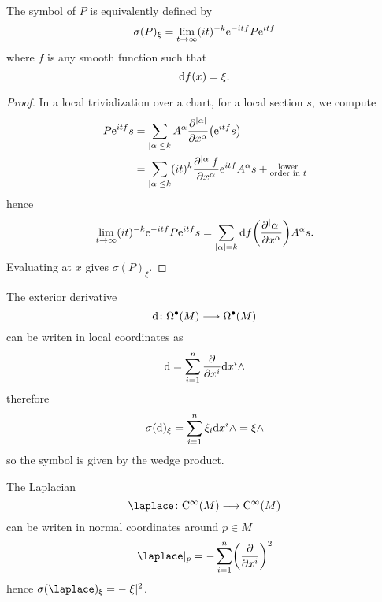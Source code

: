 \begin{lemma}
  The symbol of $P$ is equivalently defined by
  \begin{equation*}
    \sigma(P)_\xi = \lim_{t \to \infty} (it)^{-k} \mathrm{e}^{-i t f}
    P \mathrm{e}^{i t f}
  \end{equation*}
  where $f$ is any smooth function such that
  \begin{equation*}
    \mathrm{d} f (x) = \xi.
  \end{equation*}
\end{lemma}
\begin{proof}
  In a local trivialization over a chart, for a local section $s$, we compute
  \begin{align*}
    P \mathrm{e}^{i t f} s
     & = \sum_{|\alpha| \leq k} A^\alpha
    \frac{\partial^{|\alpha|}}{\partial x^\alpha}
    \bigl( \mathrm{e}^{i t f} s \bigr)       \\
     & = \sum_{|\alpha| \leq k} (i t)^k
    \frac{\partial^{|\alpha|} f}{\partial x^\alpha} \mathrm{e}^{i t f}
    A^\alpha s +
    \substack{\text{lower}               \\ \text{order in } t}
  \end{align*}
  hence
  \begin{equation*}
    \lim_{t \to \infty} (it)^{-k} \mathrm{e}^{-i t f} P \mathrm{e}^{i t f} s
    = \sum_{|\alpha| = k} \mathrm{d} f \biggl( \frac{\partial^|\alpha|}{\partial x^\alpha} \biggr) A^\alpha s.
  \end{equation*}
  Evaluating at $x$ gives $\sigma(P)_\xi$.
\end{proof}

\begin{example}
  The exterior derivative
  \begin{equation*}
    \mathrm{d} \colon \Omega^\bullet(M) \longrightarrow \Omega^\bullet (M)
  \end{equation*}
  can be writen in local coordinates as
  \begin{equation*}
    \mathrm{d} = \sum_{i=1}^n \frac{\partial}{\partial x^i} \mathrm{d} x^i \wedge
  \end{equation*}
  therefore
  \begin{equation*}
    \sigma(\mathrm{d})_\xi = \sum_{i=1}^n \xi_i \mathrm{d} x^i \wedge = \xi \wedge
  \end{equation*}
  so the symbol is given by the wedge product.
\end{example}

\begin{example}
  The Laplacian
  \begin{equation*}
    \laplace \colon \Crm^\infty(M) \longrightarrow \Crm^\infty (M)
  \end{equation*}
  can be writen in normal coordinates around $p \in M$
  \begin{equation*}
    \laplace |_p = - \sum_{i = 1}^n
    \biggl( \frac{\partial}{\partial x^i} \biggr)^2
  \end{equation*}
  hence $\sigma (\laplace)_\xi = - |\xi|^2$.
\end{example}

